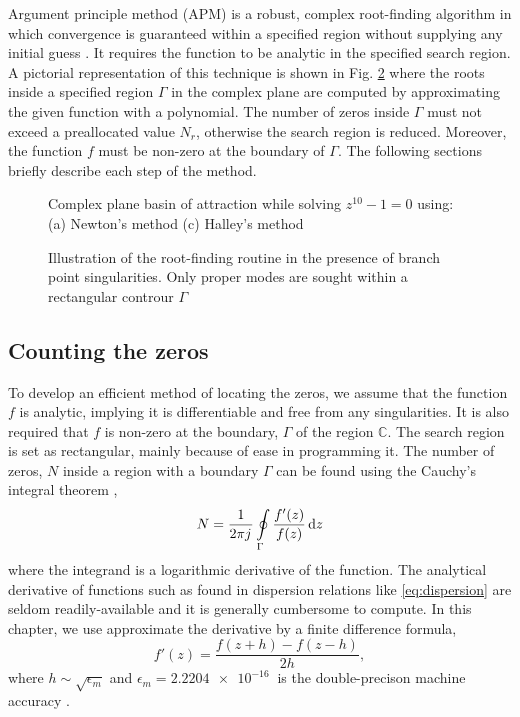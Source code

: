\documentclass[12pt]{article}
\begin{document}
Argument principle method (APM) is a robust, complex root-finding algorithm in which convergence is guaranteed within a specified region without supplying any initial guess \cite{Delves1967c,Carpentier1982c,Botten1983,Kravanja2000c,Dellnitz2002c,Gillan2006c,Chen2017}. It requires the function to be analytic in the specified search region. A pictorial representation of this technique is shown in Fig. \ref{fig:zplane} where the roots inside a specified region $\Gamma$ in the complex plane are computed by approximating the given function with a polynomial. The number of zeros inside $\Gamma$ must not exceed a preallocated value $N_r$, otherwise the search region is reduced. Moreover, the function $f$ must be non-zero at the boundary of $\Gamma$. The following sections briefly describe each step of the method.
%
\begin{figure}[t!]
  \centering
   \hfil
  \caption{Complex plane basin of attraction while solving $z^{10} - 1 =0$ using: (a) Newton's method (c) Halley's method}
  \label{fig:basins}
\end{figure}
%
\begin{figure}[t!]
  \centering
  \def\svgwidth{.5\linewidth}
  
  \caption{Illustration of the root-finding routine in the presence of branch point singularities. Only proper modes are sought within a rectangular controur $\Gamma$}
  \label{fig:zplane}
\end{figure}
\subsection{Counting the zeros}
%
To develop an efficient method of locating the zeros, we assume that the function $f$ is analytic, implying it is differentiable and free from any singularities. It is also required that $f$ is non-zero at the boundary, $\Gamma$ of the region $\mathbb{C}$. The search region is set as rectangular, mainly because of ease in programming it. The number of zeros, $N$ inside a region with a boundary $\Gamma$ can be found using the Cauchy's integral theorem \cite[pg. 71]{Krantz1999,Delves1967c},
%
\begin{equation}
  N = \frac{1}{2 \pi j\mkern1mu} \oint \limits_{\Gamma} \frac{f'(z)}{f(z)} \mathop{}\!\mathrm{d}{z}
  \label{eq:cauchyth}
\end{equation}
%
where the integrand is a logarithmic derivative of the function. The analytical derivative of functions such as found in dispersion relations like \eqref{eq:dispersion} are seldom readily-available and it is generally cumbersome to compute. In this chapter, we use approximate the derivative by a finite difference formula,
%
\begin{equation}
  f'(z) = \frac{f(z + h) - f(z - h)}{2 h},
  \label{eq:FD}
\end{equation}
%
where $h \sim \sqrt{\epsilon_m}$ and $\epsilon_m = \SI{2.2204e-16}{}$ is the double-precison machine accuracy \cite[pg. 230]{press2007numerical}.
\end{document}
